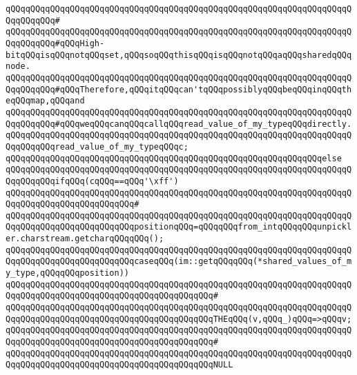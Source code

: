 \verb|qQQqqQQqqQQqqQQqqQQqqQQqqQQqqQQqqQQqqQQqqQQqqQQqqQQqqQQqqQQqqQQqqQQqqQQqqQQqqQQq#|\newline
\verb|qQQqqQQqqQQqqQQqqQQqqQQqqQQqqQQqqQQqqQQqqQQqqQQqqQQqqQQqqQQqqQQqqQQqqQQqqQQqqQQq#qQQqHigh-bitqQQqisqQQqnotqQQqset,qQQqsoqQQqthisqQQqisqQQqnotqQQqaqQQqsharedqQQqnode.|\newline
\verb|qQQqqQQqqQQqqQQqqQQqqQQqqQQqqQQqqQQqqQQqqQQqqQQqqQQqqQQqqQQqqQQqqQQqqQQqqQQqqQQq#qQQqTherefore,qQQqitqQQqcan'tqQQqpossiblyqQQqbeqQQqinqQQqtheqQQqmap,qQQqand|\newline
\verb|qQQqqQQqqQQqqQQqqQQqqQQqqQQqqQQqqQQqqQQqqQQqqQQqqQQqqQQqqQQqqQQqqQQqqQQqqQQqqQQq#qQQqweqQQqcanqQQqcallqQQqread_value_of_my_typeqQQqdirectly.|\newline
\newline
\verb|qQQqqQQqqQQqqQQqqQQqqQQqqQQqqQQqqQQqqQQqqQQqqQQqqQQqqQQqqQQqqQQqqQQqqQQqqQQqqQQqread_value_of_my_typeqQQqc;|\newline
\verb|qQQqqQQqqQQqqQQqqQQqqQQqqQQqqQQqqQQqqQQqqQQqqQQqqQQqqQQqqQQqqQQqelse|\newline
\verb|qQQqqQQqqQQqqQQqqQQqqQQqqQQqqQQqqQQqqQQqqQQqqQQqqQQqqQQqqQQqqQQqqQQqqQQqqQQqqQQqifqQQq(cqQQq==qQQq'\xff')|\newline
\verb|qQQqqQQqqQQqqQQqqQQqqQQqqQQqqQQqqQQqqQQqqQQqqQQqqQQqqQQqqQQqqQQqqQQqqQQqqQQqqQQqqQQqqQQqqQQqqQQq#|\newline
\verb|qQQqqQQqqQQqqQQqqQQqqQQqqQQqqQQqqQQqqQQqqQQqqQQqqQQqqQQqqQQqqQQqqQQqqQQqqQQqqQQqqQQqqQQqqQQqqQQqpositionqQQq=qQQqqQQqfrom_intqQQqqQQqunpickler.charstream.getcharqQQqqQQq();|\newline
\newline
\verb|qQQqqQQqqQQqqQQqqQQqqQQqqQQqqQQqqQQqqQQqqQQqqQQqqQQqqQQqqQQqqQQqqQQqqQQqqQQqqQQqqQQqqQQqqQQqqQQqcaseqQQq(im::getqQQqqQQq(*shared_values_of_my_type,qQQqqQQqposition))|\newline
\verb|qQQqqQQqqQQqqQQqqQQqqQQqqQQqqQQqqQQqqQQqqQQqqQQqqQQqqQQqqQQqqQQqqQQqqQQqqQQqqQQqqQQqqQQqqQQqqQQqqQQqqQQqqQQqqQQq#|\newline
\verb|qQQqqQQqqQQqqQQqqQQqqQQqqQQqqQQqqQQqqQQqqQQqqQQqqQQqqQQqqQQqqQQqqQQqqQQqqQQqqQQqqQQqqQQqqQQqqQQqqQQqqQQqqQQqqQQqTHEqQQq(v,qQQq_)qQQq=>qQQqv;|\newline
\verb|qQQqqQQqqQQqqQQqqQQqqQQqqQQqqQQqqQQqqQQqqQQqqQQqqQQqqQQqqQQqqQQqqQQqqQQqqQQqqQQqqQQqqQQqqQQqqQQqqQQqqQQqqQQqqQQq#|\newline
\verb|qQQqqQQqqQQqqQQqqQQqqQQqqQQqqQQqqQQqqQQqqQQqqQQqqQQqqQQqqQQqqQQqqQQqqQQqqQQqqQQqqQQqqQQqqQQqqQQqqQQqqQQqqQQqqQQqNULL|\newline

